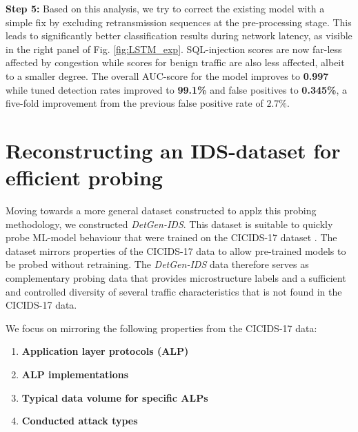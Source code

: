 \documentclass[runningheads]{llncs}
\begin{document}
\textbf{Step 5:} Based on this analysis, we try to correct the existing model with a simple fix by excluding retransmission sequences at the pre-processing stage. This leads to significantly better classification results during network latency, as visible in the right panel of Fig. \ref{fig:LSTM_exp}. SQL-injection scores are now far-less affected by congestion while scores for benign traffic are also less affected, albeit to a smaller degree.
The overall AUC-score for the model improves to \textbf{0.997} while tuned detection rates improved to \textbf{99.1\%} and false positives to \textbf{0.345\%}, a five-fold improvement from the previous false positive rate of $2.7\%$. 



\section{Reconstructing an IDS-dataset for efficient probing}\label{Sec:ProbData}


Moving towards a more general dataset constructed to applz this probing methodology, 
we constructed \textit{DetGen-IDS}. This dataset is suitable to quickly probe ML-model behaviour that were trained on the CICIDS-17 dataset \cite{sharafaldin2018toward}. The dataset mirrors properties of the CICIDS-17 data to allow pre-trained models to be probed without retraining.
The \textit{DetGen-IDS} data therefore serves as complementary probing data that provides microstructure labels and a sufficient and controlled diversity of several traffic characteristics that is not found in the CICIDS-17 data.

We focus on mirroring the following properties from the CICIDS-17 data:
\begin{enumerate}

\item \textbf{Application layer protocols (ALP)}
\item \textbf{ALP implementations}
\item \textbf{Typical data volume for specific ALPs}
\item \textbf{Conducted attack types}

\end{enumerate}
\end{document}
